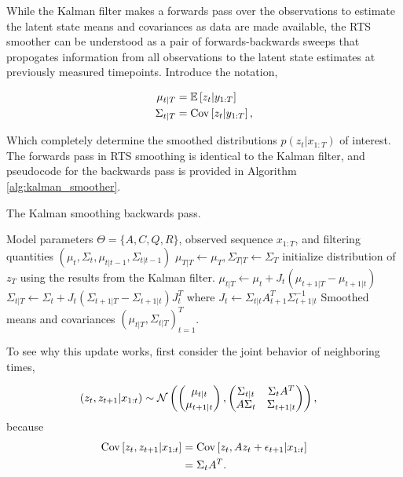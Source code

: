 \documentclass{article}
\begin{document}
While the Kalman filter makes a forwards pass over the observations to estimate
the latent state means and covariances as data are made available, the RTS
smoother can be understood as a pair of forwards-backwards sweeps that
propogates information from all observations to the latent state estimates at
previously measured timepoints. Introduce the notation,

\begin{align*}
\mu_{t \vert T} &= \mathbb{E}\left[{z_{t} \vert y_{1:T}}\right] \\
\Sigma_{t \vert T} &= \mathrm{Cov}\left[{z_{t} \vert y_{1:T}}\right],
\end{align*}

Which completely determine the smoothed distributions $p\left(z_{t} \vert
x_{1:T}\right)$ of interest. The forwards pass in RTS smoothing is identical to
the Kalman filter, and pseudocode for the backwards pass is provided in
Algorithm \ref{alg:kalman_smoother}.

\begin{algorithm}
   \caption{The Kalman smoothing backwards pass.}
   \label{alg:kalman_smoother}
\begin{algorithmic}
   Model parameters $\Theta = \{A, C, Q, R\}$,
    observed sequence $x_{1:T}$, and filtering quantities $\left(\mu_{t},
    \Sigma_{t}, \mu_{t \vert t - 1}, \Sigma_{t \vert t - 1}\right)$
    \STATE $\mu_{T \vert T} \leftarrow \mu_{T}, \Sigma_{T \vert T} \leftarrow
    \Sigma_{T}$ \hfill initialize distribution of $z_{T}$ using the results from
    the Kalman filter.
    \STATE $\mu_{t \vert T} \leftarrow \mu_{t} + J_{t}\left(\mu_{t + 1 \vert T} - \mu_{t + 1 \vert t}\right)$
    \STATE $\Sigma_{t \vert T} \leftarrow \Sigma_{t} + J_{t}\left(\Sigma_{t + 1 \vert T} - \Sigma_{t + 1 \vert t}\right)J_{t}^{T}$
    \STATE where $J_{t} \leftarrow \Sigma_{t \vert t}A_{t + 1}^{T} \Sigma_{t + 1\vert t}^{-1}$
    \ENDFOR
     Smoothed means and covariances $\left(\mu_{t \vert T},
    \Sigma_{t \vert T}\right)_{t = 1}^{T}$.
\end{algorithmic}
\end{algorithm}

To see why this update works, first consider the joint behavior of neighboring
times,

\begin{align*}
   \left(z_{t}, z_{t + 1} \vert x_{1:t}\right) &\sim \mathcal{N}\left(
\begin{pmatrix}
  \mu_{t \vert t} \\
  \mu_{t + 1 \vert t}
\end{pmatrix},
\begin{pmatrix}
  \Sigma_{t \vert t} & \Sigma_{t} A^{T} \\
  A \Sigma_{t} & \Sigma_{t + 1 \vert t}
\end{pmatrix}\right),
\end{align*}
because
\begin{align*}
\mathrm{Cov}\left[{z_{t}, z_{t + 1} \vert x_{1:t}}\right] &= \mathrm{Cov}\left[{z_{t}, Az_{t} + \epsilon_{t + 1} \vert x_{1:t}}\right] \\
&= \Sigma_{t}A^{T}.
\end{align*}
\end{document}
